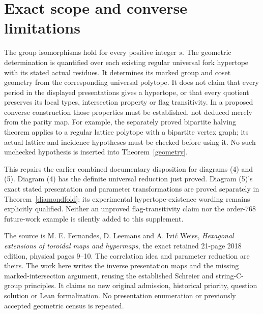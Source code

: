 \documentclass[11pt,a4paper]{article}
\begin{document}
\section{Exact scope and converse limitations}
The group isomorphisms hold for every positive integer $s$. The geometric
determination is quantified over each existing regular universal fork
hypertope with its stated actual residues. It determines its marked group
and coset geometry from the corresponding universal polytope. It does
not claim that every period in the displayed presentations gives a
hypertope, or that every quotient preserves its local types, intersection
property or flag transitivity. In a proposed converse construction those
properties must be established, not deduced merely from the parity map.
For example, the separately proved bipartite halving theorem applies to a
regular lattice polytope with a bipartite vertex graph; its actual lattice
and incidence hypotheses must be checked before using it. No such
unchecked hypothesis is inserted into Theorem~\ref{geometry}.

This repairs the earlier combined documentary disposition for diagrams
(4) and (5). Diagram (4) has the definite universal reduction just proved.
Diagram (5)'s exact stated presentation and parameter transformations
are proved separately in Theorem~\ref{diamondfold}; its experimental
hypertope-existence wording remains explicitly qualified. Neither an
unproved flag-transitivity claim nor the order-768 future-work example is
silently added to this supplement.

The source is M. E. Fernandes, D. Leemans and A. Ivi\'c Weiss,
\emph{Hexagonal extensions of toroidal maps and hypermaps}, the exact
retained 21-page 2018 edition, physical pages 9--10. The correlation idea
and parameter reduction are theirs. The work here writes the inverse
presentation maps and the missing marked-intersection argument, reusing
the established Schreier and string-C-group principles. It claims no
new original admission, historical priority, question solution or Lean
formalization. No presentation enumeration or previously accepted
geometric census is repeated.
\end{document}
